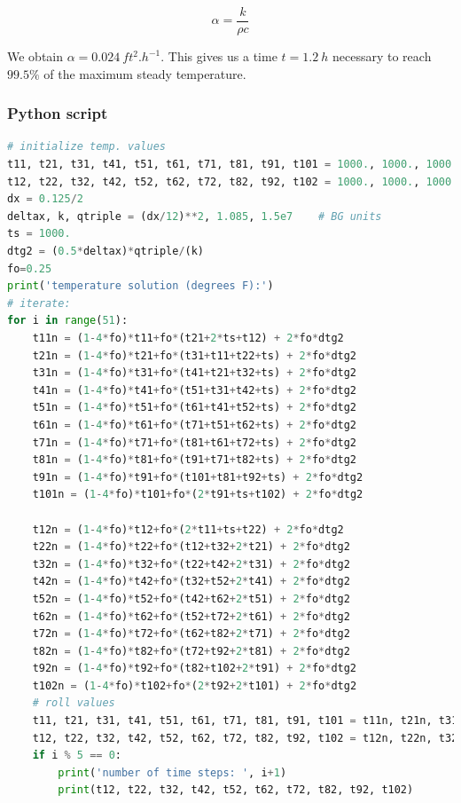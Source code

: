 \begin{equation}\label{eq720}
\alpha = \frac{k}{\rho c}
\end{equation}

We obtain $\alpha = 0.024\ ft^{2}.h^{-1}$. This gives us a time $t = 1.2\ h$ necessary to reach $99.5\%$ of the maximum steady temperature.

\newpage
\subsubsection{Python script}
\label{py2}
\begin{lstlisting}[language=python]
# initialize temp. values
t11, t21, t31, t41, t51, t61, t71, t81, t91, t101 = 1000., 1000., 1000., 1000., 1000., 1000., 1000., 1000., 1000., 1000.
t12, t22, t32, t42, t52, t62, t72, t82, t92, t102 = 1000., 1000., 1000., 1000., 1000., 1000., 1000., 1000., 1000., 1000.
dx = 0.125/2
deltax, k, qtriple = (dx/12)**2, 1.085, 1.5e7    # BG units
ts = 1000.
dtg2 = (0.5*deltax)*qtriple/(k)
fo=0.25
print('temperature solution (degrees F):')
# iterate:
for i in range(51):
    t11n = (1-4*fo)*t11+fo*(t21+2*ts+t12) + 2*fo*dtg2
    t21n = (1-4*fo)*t21+fo*(t31+t11+t22+ts) + 2*fo*dtg2
    t31n = (1-4*fo)*t31+fo*(t41+t21+t32+ts) + 2*fo*dtg2
    t41n = (1-4*fo)*t41+fo*(t51+t31+t42+ts) + 2*fo*dtg2
    t51n = (1-4*fo)*t51+fo*(t61+t41+t52+ts) + 2*fo*dtg2
    t61n = (1-4*fo)*t61+fo*(t71+t51+t62+ts) + 2*fo*dtg2
    t71n = (1-4*fo)*t71+fo*(t81+t61+t72+ts) + 2*fo*dtg2
    t81n = (1-4*fo)*t81+fo*(t91+t71+t82+ts) + 2*fo*dtg2
    t91n = (1-4*fo)*t91+fo*(t101+t81+t92+ts) + 2*fo*dtg2
    t101n = (1-4*fo)*t101+fo*(2*t91+ts+t102) + 2*fo*dtg2

    t12n = (1-4*fo)*t12+fo*(2*t11+ts+t22) + 2*fo*dtg2
    t22n = (1-4*fo)*t22+fo*(t12+t32+2*t21) + 2*fo*dtg2
    t32n = (1-4*fo)*t32+fo*(t22+t42+2*t31) + 2*fo*dtg2
    t42n = (1-4*fo)*t42+fo*(t32+t52+2*t41) + 2*fo*dtg2
    t52n = (1-4*fo)*t52+fo*(t42+t62+2*t51) + 2*fo*dtg2
    t62n = (1-4*fo)*t62+fo*(t52+t72+2*t61) + 2*fo*dtg2
    t72n = (1-4*fo)*t72+fo*(t62+t82+2*t71) + 2*fo*dtg2
    t82n = (1-4*fo)*t82+fo*(t72+t92+2*t81) + 2*fo*dtg2
    t92n = (1-4*fo)*t92+fo*(t82+t102+2*t91) + 2*fo*dtg2
    t102n = (1-4*fo)*t102+fo*(2*t92+2*t101) + 2*fo*dtg2
    # roll values
    t11, t21, t31, t41, t51, t61, t71, t81, t91, t101 = t11n, t21n, t31n, t41n, t51n, t61n, t71n, t81n, t91n, t101n
    t12, t22, t32, t42, t52, t62, t72, t82, t92, t102 = t12n, t22n, t32n, t42n, t52n, t62n, t72n, t82n, t92n, t102n
    if i % 5 == 0:
        print('number of time steps: ', i+1)
        print(t12, t22, t32, t42, t52, t62, t72, t82, t92, t102)
\end{lstlisting}
\newpage

